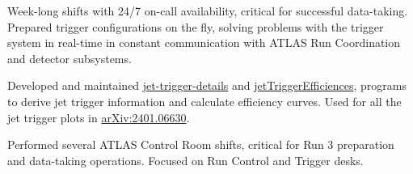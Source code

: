 
\begin{cventries}
    {Week-long shifts with 24/7 on-call availability, critical for successful data-taking. Prepared trigger configurations on the fly, solving problems with the trigger system in real-time in constant communication with ATLAS Run Coordination and detector subsystems.}

    {Developed and maintained \href{https://gitlab.cern.ch/atlas-trigger/jet/jet-trigger-details}{jet-trigger-details} and \href{https://gitlab.cern.ch/atlas-trigger/jet/jetTriggerEfficiencies/-/tree/R22-master}{jetTriggerEfficiences}, programs to derive jet trigger information and calculate efficiency curves. Used for all the jet trigger plots in \href{https://doi.org/10.48550/arXiv.2401.06630}{arXiv:2401.06630}.}

    {Performed several ATLAS Control Room shifts, critical for Run 3 preparation and data-taking operations. Focused on Run Control and Trigger desks.}

\end{cventries}